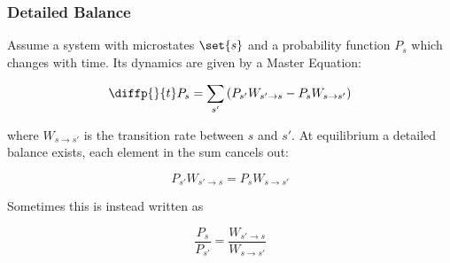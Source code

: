 \subsubsection{Detailed Balance}

Assume a system with microstates \(\set{s} \) and a probability function \(P_s\) which changes with time. Its dynamics are given by a Master Equation:

\begin{equation}
	\diffp{}{t}P_s = \sum\limits_{s'}\left(P_{s'}W_{s'\rightarrow s} - P_s W_{s\rightarrow s'}\right)
\end{equation}

where \(W_{s\rightarrow s'}\) is the transition rate between \(s\) and \(s'\). At equilibrium a detailed balance exists, each element in the sum cancels out:

\begin{equation}
	P_{s'}W_{s'\rightarrow s} = P_s W_{s\rightarrow s'}
\end{equation}

Sometimes this is instead written as

\begin{equation}
	\frac{P_s}{P_{s'}} = \frac{W_{s'\rightarrow s}}{W_{s\rightarrow s'}}
\end{equation}